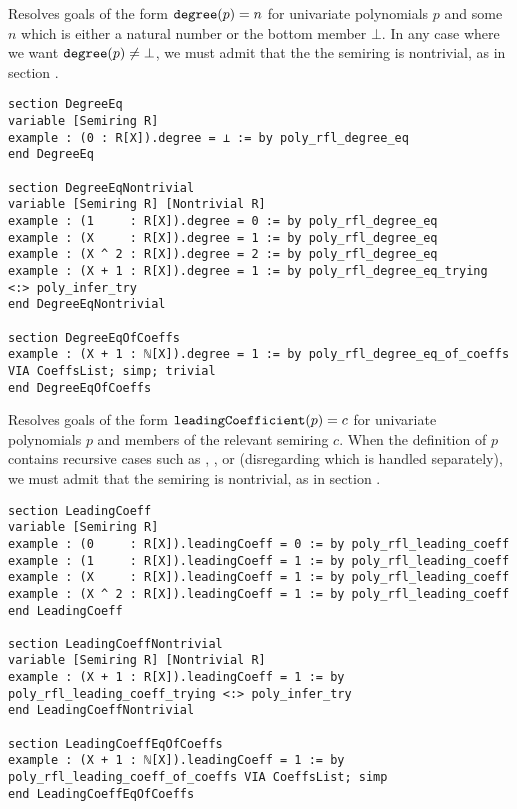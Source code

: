 \begin{tactic}
\label{tac:poly_rfl_degree_eq}
\leanok
{}
Resolves goals of the form $\mathtt{degree}(p) = n$ for univariate polynomials $p$ and some $n$ which is either a natural number or the bottom member $\bot$. In any case where we want $\mathtt{degree}(p) \neq \bot$, we must admit that the the semiring is nontrivial, as in section .
\begin{lstlisting}
section DegreeEq
variable [Semiring R]
example : (0 : R[X]).degree = ⊥ := by poly_rfl_degree_eq
end DegreeEq

section DegreeEqNontrivial
variable [Semiring R] [Nontrivial R]
example : (1     : R[X]).degree = 0 := by poly_rfl_degree_eq
example : (X     : R[X]).degree = 1 := by poly_rfl_degree_eq
example : (X ^ 2 : R[X]).degree = 2 := by poly_rfl_degree_eq
example : (X + 1 : R[X]).degree = 1 := by poly_rfl_degree_eq_trying <:> poly_infer_try
end DegreeEqNontrivial

section DegreeEqOfCoeffs
example : (X + 1 : ℕ[X]).degree = 1 := by poly_rfl_degree_eq_of_coeffs VIA CoeffsList; simp; trivial
end DegreeEqOfCoeffs
\end{lstlisting}
\end{tactic}

\begin{tactic}
\label{tac:poly_rfl_leading_coeff}
\leanok
{}
Resolves goals of the form $\mathtt{leadingCoefficient}(p) = c$ for univariate polynomials $p$ and members of the relevant semiring $c$. When the definition of $p$ contains recursive cases such as \leaninline{+}, \leaninline{*}, or \leaninline{\^{}} (disregarding  which is handled separately), we must admit that the semiring is nontrivial, as in section .
\begin{lstlisting}
section LeadingCoeff
variable [Semiring R]
example : (0     : R[X]).leadingCoeff = 0 := by poly_rfl_leading_coeff
example : (1     : R[X]).leadingCoeff = 1 := by poly_rfl_leading_coeff
example : (X     : R[X]).leadingCoeff = 1 := by poly_rfl_leading_coeff
example : (X ^ 2 : R[X]).leadingCoeff = 1 := by poly_rfl_leading_coeff
end LeadingCoeff

section LeadingCoeffNontrivial
variable [Semiring R] [Nontrivial R]
example : (X + 1 : R[X]).leadingCoeff = 1 := by poly_rfl_leading_coeff_trying <:> poly_infer_try
end LeadingCoeffNontrivial

section LeadingCoeffEqOfCoeffs
example : (X + 1 : ℕ[X]).leadingCoeff = 1 := by poly_rfl_leading_coeff_of_coeffs VIA CoeffsList; simp
end LeadingCoeffEqOfCoeffs
\end{lstlisting}
\end{tactic}

